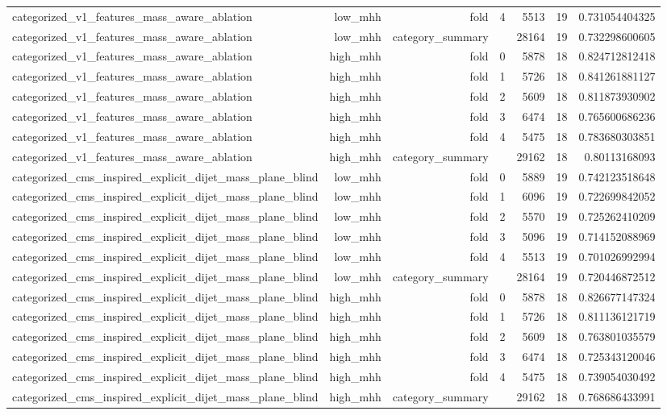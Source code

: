 \begin{table}[htbp]
{\begin{tabular}{lrrrrrr}
categorized\_v1\_features\_mass\_aware\_ablation & low\_mhh & fold & 4 & 5513 & 19 & 0.731054404325 \\
categorized\_v1\_features\_mass\_aware\_ablation & low\_mhh & category\_summary &  & 28164 & 19 & 0.732298600605 \\
categorized\_v1\_features\_mass\_aware\_ablation & high\_mhh & fold & 0 & 5878 & 18 & 0.824712812418 \\
categorized\_v1\_features\_mass\_aware\_ablation & high\_mhh & fold & 1 & 5726 & 18 & 0.841261881127 \\
categorized\_v1\_features\_mass\_aware\_ablation & high\_mhh & fold & 2 & 5609 & 18 & 0.811873930902 \\
categorized\_v1\_features\_mass\_aware\_ablation & high\_mhh & fold & 3 & 6474 & 18 & 0.765600686236 \\
categorized\_v1\_features\_mass\_aware\_ablation & high\_mhh & fold & 4 & 5475 & 18 & 0.783680303851 \\
categorized\_v1\_features\_mass\_aware\_ablation & high\_mhh & category\_summary &  & 29162 & 18 & 0.80113168093 \\
categorized\_cms\_inspired\_explicit\_dijet\_mass\_plane\_blind & low\_mhh & fold & 0 & 5889 & 19 & 0.742123518648 \\
categorized\_cms\_inspired\_explicit\_dijet\_mass\_plane\_blind & low\_mhh & fold & 1 & 6096 & 19 & 0.722699842052 \\
categorized\_cms\_inspired\_explicit\_dijet\_mass\_plane\_blind & low\_mhh & fold & 2 & 5570 & 19 & 0.725262410209 \\
categorized\_cms\_inspired\_explicit\_dijet\_mass\_plane\_blind & low\_mhh & fold & 3 & 5096 & 19 & 0.714152088969 \\
categorized\_cms\_inspired\_explicit\_dijet\_mass\_plane\_blind & low\_mhh & fold & 4 & 5513 & 19 & 0.701026992994 \\
categorized\_cms\_inspired\_explicit\_dijet\_mass\_plane\_blind & low\_mhh & category\_summary &  & 28164 & 19 & 0.720446872512 \\
categorized\_cms\_inspired\_explicit\_dijet\_mass\_plane\_blind & high\_mhh & fold & 0 & 5878 & 18 & 0.826677147324 \\
categorized\_cms\_inspired\_explicit\_dijet\_mass\_plane\_blind & high\_mhh & fold & 1 & 5726 & 18 & 0.811136121719 \\
categorized\_cms\_inspired\_explicit\_dijet\_mass\_plane\_blind & high\_mhh & fold & 2 & 5609 & 18 & 0.763801035579 \\
categorized\_cms\_inspired\_explicit\_dijet\_mass\_plane\_blind & high\_mhh & fold & 3 & 6474 & 18 & 0.725343120046 \\
categorized\_cms\_inspired\_explicit\_dijet\_mass\_plane\_blind & high\_mhh & fold & 4 & 5475 & 18 & 0.739054030492 \\
categorized\_cms\_inspired\_explicit\_dijet\_mass\_plane\_blind & high\_mhh & category\_summary &  & 29162 & 18 & 0.768686433991 \\
\bottomrule
\end{tabular}
}
\end{table}
